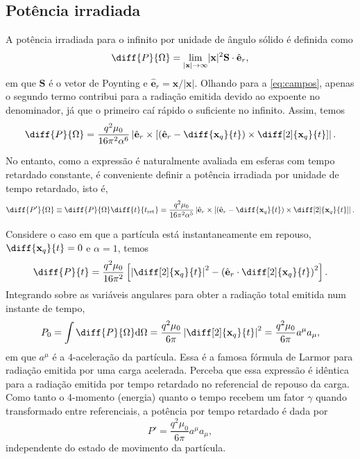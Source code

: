 \documentclass[12pt]{article}
\newcommand{\dd}{\mathrm{d}}
\newcommand{\x}{\mathbf{x}}
\newcommand{\xq}{\mathbf{x}_q}
\newcommand{\tr}{t_{\text{ret}}}
\newcommand{\er}{\hat{\mathbf{e}}_r}
\begin{document}
\subsection*{Potência irradiada}
A potência irradiada para o infinito por unidade de ângulo sólido é definida como
\begin{equation}
    \diff{P}{\Omega}=\lim_{\lvert\x\rvert\to\infty}\lvert\x\rvert^2\mathbf{S}\cdot\er,
\end{equation}
em que \(\mathbf{S}\) é o vetor de Poynting e \(\er=\x/\lvert\x\rvert\). Olhando para a \cref{eq:campos}, apenas o segundo termo contribui para a radiação emitida devido ao expoente no denominador, já que o primeiro caí rápido o suficiente no infinito. Assim, temos
\begin{equation}
    \diff{P}{\Omega}=\frac{q^2\mu_0}{16\pi^2\alpha^6}\left\lvert\er\times\left[\left(\er-\diff{\xq}{t}\right)\times\diff[2]{\xq}{t}\right]\right\rvert.
\end{equation}

No entanto, como a expressão é naturalmente avaliada em esferas com tempo retardado constante, é conveniente definir a potência irradiada por unidade de tempo retardado, isto é,
\begin{equation}
    \diff{P'}{\Omega}\equiv\diff{P}{\Omega}\diff{t}{\tr}=\frac{q^2\mu_0}{16\pi^2\alpha^5}\left\lvert\er\times\left[\left(\er-\diff{\xq}{t}\right)\times\diff[2]{\xq}{t}\right]\right\rvert.
\end{equation}

Considere o caso em que a partícula está instantaneamente em repouso, \(\diff{\xq}{t}=0\) e \(\alpha=1\), temos
\begin{equation}
    \diff{P}{t}=\frac{q^2\mu_0}{16\pi^2}\left[\left\lvert\diff[2]{\xq}{t}\right\rvert^2-\left(\er\cdot\diff[2]{\xq}{t}\right)^2\right].
\end{equation}
Integrando sobre as variáveis angulares para obter a radiação total emitida num instante de tempo,
\begin{equation}
    P_0=\int\diff{P}{\Omega}\dd\Omega=\frac{q^2\mu_0}{6\pi}\left\lvert\diff[2]{\xq}{t}\right\rvert^2=\frac{q^2\mu_0}{6\pi}a^\mu a_\mu,
\end{equation}
em que \(a^\mu\) é a 4-aceleração da partícula. Essa é a famosa fórmula de Larmor para radiação emitida por uma carga acelerada. Perceba que essa expressão é idêntica para a radiação emitida por tempo retardado no referencial de repouso da carga. Como tanto o 4-momento (energia) quanto o tempo recebem um fator \(\gamma\) quando transformado entre referenciais, a potência por tempo retardado é dada por
\begin{equation}
    P'=\frac{q^2\mu_0}{6\pi}a^\mu a_\mu,
\end{equation}
independente do estado de movimento da partícula.
\end{document}
